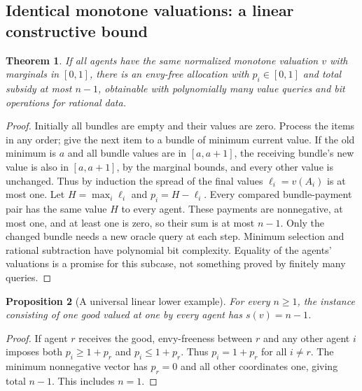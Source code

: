 \documentclass[11pt,a4paper]{article}
\newtheorem{theorem}{Theorem}[section]
\newtheorem{proposition}[theorem]{Proposition}
\theoremstyle{remark}\newtheorem{remark}[theorem]{Remark}
\begin{document}
\subsection{Identical monotone valuations: a linear constructive bound}
\begin{theorem}\label{thm:identical}
If all agents have the same normalized monotone valuation $v$ with marginals in $[0,1]$, there is an envy-free allocation with $p_i\in[0,1]$ and total subsidy at most $n-1$, obtainable with polynomially many value queries and bit operations for rational data.
\end{theorem}
\begin{proof}
Initially all bundles are empty and their values are zero. Process the items in any order; give the next item to a bundle of minimum current value. If the old minimum is $a$ and all bundle values are in $[a,a+1]$, the receiving bundle's new value is also in $[a,a+1]$, by the marginal bounds, and every other value is unchanged. Thus by induction the spread of the final values $\ell_i=v(A_i)$ is at most one. Let $H=\max_i\ell_i$ and $p_i=H-\ell_i$. Every compared bundle-payment pair has the same value $H$ to every agent. These payments are nonnegative, at most one, and at least one is zero, so their sum is at most $n-1$. Only the changed bundle needs a new oracle query at each step. Minimum selection and rational subtraction have polynomial bit complexity. Equality of the agents' valuations is a promise for this subcase, not something proved by finitely many queries.
\end{proof}

\begin{proposition}[A universal linear lower example]\label{prop:lower}
For every $n\ge1$, the instance consisting of one good valued at one by every agent has $s(v)=n-1$.
\end{proposition}
\begin{proof}
If agent $r$ receives the good, envy-freeness between $r$ and any other agent $i$ imposes both $p_i\ge1+p_r$ and $p_i\le1+p_r$. Thus $p_i=1+p_r$ for all $i\ne r$. The minimum nonnegative vector has $p_r=0$ and all other coordinates one, giving total $n-1$. This includes $n=1$.
\end{proof}
\end{document}
